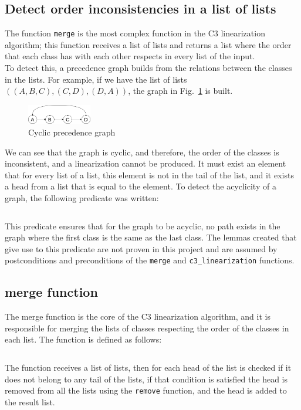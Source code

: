 \documentclass[runningheads]{llncs}
\begin{document}
\subsection{Detect order inconsistencies in a list of lists}
\label{sec:detectOrderInconsistencies}
The function \texttt{merge} is the most complex function in the C3 linearization algorithm; this function receives a list of lists and returns a list where the order that each class has with each other respects in every list of the input.\\
To detect this, a precedence graph builds from the relations between the classes in the lists. For example, if we have the list of lists $((A, B, C),(C, D),(D, A))$, the graph in Fig.~\ref{fig:cyclicGraph} is built.
\begin{figure}[htbp]
  \centering
  \includegraphics[width=0.25\textwidth]{images/cyclicGraph.png}
  \caption{Cyclic precedence graph}
  \label{fig:cyclicGraph}
\end{figure}
We can see that the graph is cyclic, and therefore, the order of the classes is inconsistent, and a linearization cannot be produced.
It must exist an element that for every list of a list, this element is not in the tail of the list, and it exists a head from a list that is equal to the element. %
To detect the acyclicity of a graph, the following predicate was written:
\inputminted[firstline=64,lastline=80,fontsize=\small,linenos,xleftmargin=20pt]{ocaml}{../cameleer/c3.ml}
This predicate ensures that for the graph to be acyclic, no path exists in the graph where the first class is the same as the last class.
The lemmas created that give use to this predicate are not proven in this project and are assumed by postconditions and preconditions of the \texttt{merge} and \texttt{c3\_linearization} functions.

\subsection{merge function}
The merge function is the core of the C3 linearization algorithm, and it is responsible for merging the lists of classes respecting the order of the classes in each list.
The function is defined as follows:
\inputminted[firstline=363,lastline=386,fontsize=\small,linenos,xleftmargin=20pt]{ocaml}{../cameleer/c3.ml}
The function receives a list of lists, then for each head of the list is checked if it does not belong to any tail of the lists, 
if that condition is satisfied the head is removed from all the lists using the \texttt{remove} function, and the head is added to the result list.
\end{document}
